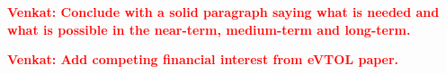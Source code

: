 \documentclass{achemso}
\newcommand{\vv}[1]{{\textbf{\textcolor{red}{Venkat: #1}}}}
\begin{document}

\vv{Conclude with a solid paragraph saying what is needed and what is possible in the near-term, medium-term and long-term.}

%

\vv{Add competing financial interest from eVTOL paper.}

\end{document}
